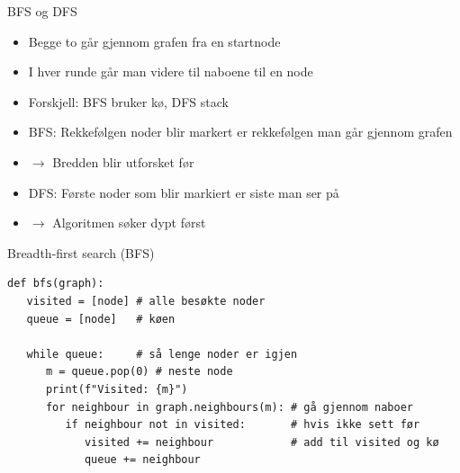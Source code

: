 \begin{frame}{BFS og DFS}
\begin{itemize}
\item Begge to går gjennom grafen fra en startnode
\item I hver runde går man videre til naboene til en node
\item Forskjell: BFS bruker kø, DFS stack
\item BFS: Rekkefølgen noder blir markert er rekkefølgen man går gjennom grafen
\item $\rightarrow$ Bredden blir utforsket før
\item DFS: Første noder som blir markiert er siste man ser på
\item $\rightarrow$ Algoritmen søker dypt først
\end{itemize}
\end{frame}

\begin{frame}[fragile]{Breadth-first search (BFS)}
\begin{verbatim}
def bfs(graph):
   visited = [node] # alle besøkte noder
   queue = [node]   # køen
	
   while queue:     # så lenge noder er igjen
      m = queue.pop(0) # neste node 
      print(f"Visited: {m}")
      for neighbour in graph.neighbours(m): # gå gjennom naboer
         if neighbour not in visited:       # hvis ikke sett før
            visited += neighbour            # add til visited og kø
            queue += neighbour
\end{verbatim}
\end{frame}

